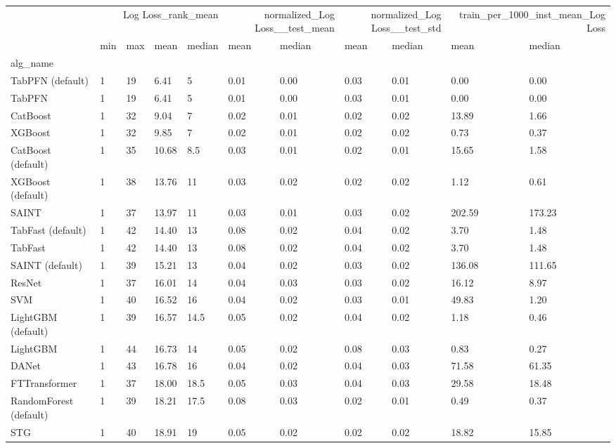 \begin{tabular}{lllllllllll}
\toprule
 & \multicolumn{4}{r}{Log Loss_rank_mean} & \multicolumn{2}{r}{normalized_Log Loss__test_mean} & \multicolumn{2}{r}{normalized_Log Loss__test_std} & \multicolumn{2}{r}{train_per_1000_inst_mean_Log Loss} \\
 & min & max & mean & median & mean & median & mean & median & mean & median \\
alg_name &  &  &  &  &  &  &  &  &  &  \\
\midrule
TabPFN (default) & 1 & 19 & 6.41 & 5 & 0.01 & 0.00 & 0.03 & 0.01 & 0.00 & 0.00 \\
TabPFN & 1 & 19 & 6.41 & 5 & 0.01 & 0.00 & 0.03 & 0.01 & 0.00 & 0.00 \\
CatBoost & 1 & 32 & 9.04 & 7 & 0.02 & 0.01 & 0.02 & 0.02 & 13.89 & 1.66 \\
XGBoost & 1 & 32 & 9.85 & 7 & 0.02 & 0.01 & 0.02 & 0.02 & 0.73 & 0.37 \\
CatBoost (default) & 1 & 35 & 10.68 & 8.5 & 0.03 & 0.01 & 0.02 & 0.01 & 15.65 & 1.58 \\
XGBoost (default) & 1 & 38 & 13.76 & 11 & 0.03 & 0.02 & 0.02 & 0.02 & 1.12 & 0.61 \\
SAINT & 1 & 37 & 13.97 & 11 & 0.03 & 0.01 & 0.03 & 0.02 & 202.59 & 173.23 \\
TabFast (default) & 1 & 42 & 14.40 & 13 & 0.08 & 0.02 & 0.04 & 0.02 & 3.70 & 1.48 \\
TabFast & 1 & 42 & 14.40 & 13 & 0.08 & 0.02 & 0.04 & 0.02 & 3.70 & 1.48 \\
SAINT (default) & 1 & 39 & 15.21 & 13 & 0.04 & 0.02 & 0.03 & 0.02 & 136.08 & 111.65 \\
ResNet & 1 & 37 & 16.01 & 14 & 0.04 & 0.03 & 0.03 & 0.02 & 16.12 & 8.97 \\
SVM & 1 & 40 & 16.52 & 16 & 0.04 & 0.02 & 0.03 & 0.01 & 49.83 & 1.20 \\
LightGBM (default) & 1 & 39 & 16.57 & 14.5 & 0.05 & 0.02 & 0.04 & 0.02 & 1.18 & 0.46 \\
LightGBM & 1 & 44 & 16.73 & 14 & 0.05 & 0.02 & 0.08 & 0.03 & 0.83 & 0.27 \\
DANet & 1 & 43 & 16.78 & 16 & 0.04 & 0.02 & 0.04 & 0.03 & 71.58 & 61.35 \\
FTTransformer & 1 & 37 & 18.00 & 18.5 & 0.05 & 0.03 & 0.04 & 0.03 & 29.58 & 18.48 \\
RandomForest (default) & 1 & 39 & 18.21 & 17.5 & 0.08 & 0.03 & 0.02 & 0.01 & 0.49 & 0.37 \\
STG & 1 & 40 & 18.91 & 19 & 0.05 & 0.02 & 0.02 & 0.02 & 18.82 & 15.85 \\

\end{tabular}
